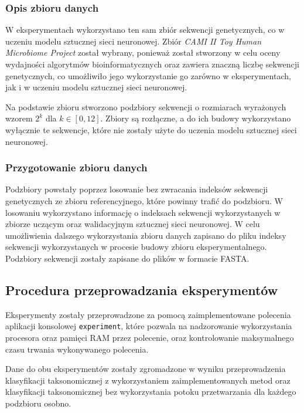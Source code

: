         \subsubsection{Opis zbioru danych}
        
            W eksperymentach wykorzystano ten sam zbiór sekwencji genetycznych, co w uczeniu modelu sztucznej sieci neuronowej. Zbiór \textit{CAMI II Toy Human Microbiome Project}\cite{Fritz:2019} został wybrany, ponieważ został stworzony w celu oceny wydajności algorytmów bioinformatycznych oraz zawiera znaczną liczbę sekwencji genetycznych, co umożliwiło jego wykorzystanie go zarówno w eksperymentach, jak i w uczeniu modelu sztucznej sieci neuronowej.
            
            Na podstawie zbioru stworzono podzbiory sekwencji o rozmiarach wyrażonych wzorem $2^k$ dla $k \in [0, 12]$. Zbiory są rozłączne, a do ich budowy wykorzystano wyłącznie te sekwencje, które nie zostały użyte do uczenia modelu sztucznej sieci neuronowej.

        \subsubsection{Przygotowanie zbioru danych}

            Podzbiory powstały poprzez losowanie bez zwracania indeksów sekwencji genetycznych ze zbioru referencyjnego, które powinny trafić do podzbioru. W losowaniu wykorzystano informację o indeksach sekwencji wykorzystanych w zbiorze uczącym oraz walidacyjnym sztucznej sieci neuronowej. W celu umożliwienia dalszego wykorzystania zbioru danych zapisano do pliku indeksy sekwencji wykorzystanych w procesie budowy zbioru eksperymentalnego. Podzbiory sekwencji zostały zapisane do plików w formacie FASTA.

    \subsection{Procedura przeprowadzania eksperymentów}

        Eksperymenty zostały przeprowadzone za pomocą zaimplementowane polecenia aplikacji konsolowej \texttt{experiment}, które pozwala na nadzorowanie wykorzystania procesora oraz pamięci RAM przez polecenie, oraz kontrolowanie maksymalnego czasu trwania wykonywanego polecenia.

        Dane do obu eksperymentów zostały zgromadzone w wyniku przeprowadzenia klasyfikacji taksonomicznej z wykorzystaniem zaimplementowanych metod oraz klasyfikacji taksonomicznej bez wykorzystania potoku przetwarzania dla każdego podzbioru osobno.

